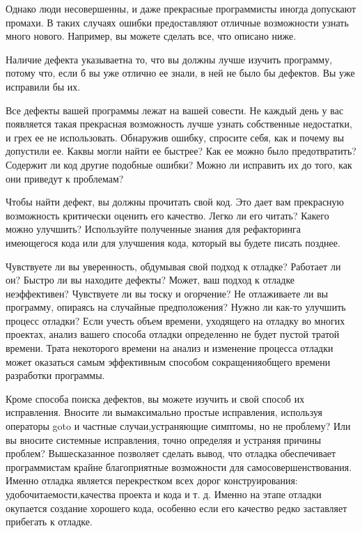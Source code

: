 \documentclass[a4paper]{article}
\begin{document}
Однако  люди  несовершенны,  и  даже  прекрасные  программисты  иногда  допускают  промахи.  В  таких  случаях  ошибки  предоставляют  отличные  возможности  узнать  много  нового.  Например,  вы  можете  сделать  все,  что  описано  ниже.

 Наличие  дефекта  указываетна то, что вы должны лучше изучить программу, потому что, если б вы уже отлично  ее  знали,  в  ней  не  было  бы  дефектов.  Вы  уже  исправили  бы  их.

 Все дефекты вашей программы  лежат  на  вашей  совести.  Не  каждый  день  у  вас  появляется  такая  прекрасная  возможность  лучше  узнать  собственные недостатки, и грех ее не использовать. Обнаружив ошибку,  спросите  себя,  как  и  почему  вы  допустили  ее.  Каквы могли найти ее быстрее? Как ее можно было предотвратить? Содержит ли код другие подобные ошибки? Можно ли исправить  их  до  того,  как  они  приведут  к  проблемам?

 Чтобы найти дефект, вы должны прочитать свой код. Это дает вам прекрасную возможность критически оценить его качество. Легко ли его читать? Какего  можно  улучшить?  Используйте  полученные  знания  для  рефакторинга  имеющегося  кода  или  для  улучшения  кода,  который  вы  будете  писать  позднее.

 Чувствуете  ли  вы  уверенность,  обдумывая  свой  подход  к  отладке?  Работает  ли  он?  Быстро  ли  вы  находите дефекты?  Может,  ваш  подход  к  отладке  неэффективен?  Чувствуете  ли  вы  тоску  и огорчение?  Не  отлаживаете  ли  вы  программу,  опираясь  на  случайные  предположения?  Нужно  ли  как-то  улучшить  процесс  отладки?  Если  учесть  объем  времени,  уходящего на отладку во многих проектах, анализ вашего способа отладки определенно не  будет  пустой  тратой  времени.  Трата  некоторого  времени  на  анализ  и  изменение процесса отладки может оказаться самым эффективным способом сокращенияобщего  времени  разработки  программы.

 Кроме способа поиска  дефектов,  вы  можете  изучить  и  свой  способ  их  исправления.  Вносите  ли  вымаксимально  простые  исправления,  используя  операторы  goto  и  частные  случаи,устраняющие  симптомы,  но  не  проблему?  Или  вы  вносите  системные  исправления,  точно  определяя  и  устраняя  причины  проблем? Вышесказанное  позволяет  сделать  вывод,  что  отладка  обеспечивает  программистам  крайне  благоприятные  возможности  для  самосовершенствования.  Именно отладка  является  перекрестком  всех  дорог  конструирования:  удобочитаемости,качества  проекта  и  кода  и  т.  д.  Именно  на  этапе  отладки  окупается  создание  хорошего  кода,  особенно  если  его  качество  редко  заставляет  прибегать  к  отладке.
\end{document}
